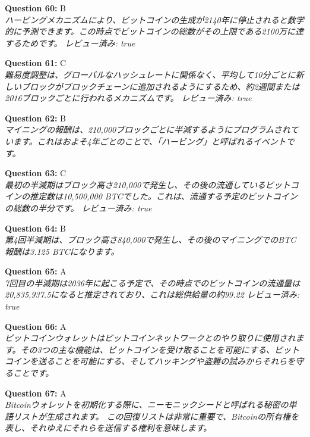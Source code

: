 \documentclass[12pt,a4paper]{article}
\begin{document}
\begin{enumerate}
{{{{{{\item \textbf{Question 60:} B
\\ \textit{ハービングメカニズムにより、ビットコインの生成が2140年に停止されると数学的に予測できます。この時点でビットコインの総数がその上限である2100万に達するためです。
レビュー済み: true}

\item \textbf{Question 61:} C
\\ \textit{難易度調整は、グローバルなハッシュレートに関係なく、平均して10分ごとに新しいブロックがブロックチェーンに追加されるようにするため、約2週間または2016ブロックごとに行われるメカニズムです。
レビュー済み: true}

\item \textbf{Question 62:} B
\\ \textit{マイニングの報酬は、210,000ブロックごとに半減するようにプログラムされています。これはおよそ4年ごとのことで、「ハービング」と呼ばれるイベントです。}

\item \textbf{Question 63:} C
\\ \textit{最初の半減期はブロック高さ210,000で発生し、その後の流通しているビットコインの推定数は10,500,000 BTCでした。これは、流通する予定のビットコインの総数の半分です。
レビュー済み: true}

\item \textbf{Question 64:} B
\\ \textit{第4回半減期は、ブロック高さ840,000で発生し、その後のマイニングでのBTC報酬は3.125 BTCになります。}

\item \textbf{Question 65:} A
\\ \textit{7回目の半減期は2036年に起こる予定で、その時点でのビットコインの流通量は20,835,937.5になると推定されており、これは総供給量の約99.22%
レビュー済み: true}

\item \textbf{Question 66:} A
\\ \textit{ビットコインウォレットはビットコインネットワークとのやり取りに使用されます。その3つの主な機能は、ビットコインを受け取ることを可能にする、ビットコインを送ることを可能にする、そしてハッキングや盗難の試みからそれらを守ることです。}

\item \textbf{Question 67:} A
\\ \textit{Bitcoinウォレットを初期化する際に、ニーモニックシードと呼ばれる秘密の単語リストが生成されます。 この回復リストは非常に重要で、Bitcoinの所有権を表し、それゆえにそれらを送信する権利を意味します。}

}}}}}}
\end{enumerate}
\end{document}
